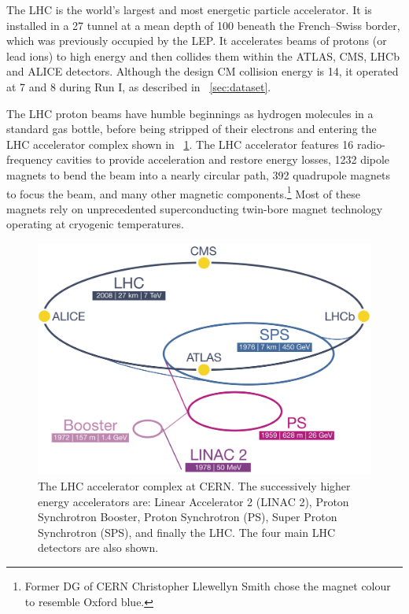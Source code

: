 
The \ac{LHC} is the world's largest and most energetic particle accelerator. It is 
installed in a \unit{27}{\kilo\metre} tunnel at a mean depth of \unit{100}{\metre} beneath 
the French--Swiss border, which was previously occupied by the \ac{LEP}. It accelerates 
beams of protons (or lead ions) to high energy and then collides them within the
ATLAS, CMS, LHCb and ALICE detectors. Although the design \ac{CM} collision energy is 
\unit{14}{\TeV}, it operated at \unit{7}{\TeV} and \unit{8}{\TeV} during Run I, as 
described in \Section~\ref{sec:dataset}.

The \ac{LHC} proton beams have humble beginnings as hydrogen molecules in a standard gas 
bottle, before being stripped of their electrons and entering the \ac{LHC} accelerator 
complex shown in \Figure~\ref{fig:lhc}. The \ac{LHC} accelerator features 16 
radio-frequency cavities to provide acceleration and restore energy losses, 1232 
dipole magnets to bend the beam into a nearly circular path, 392 quadrupole magnets to 
focus the beam, and many other magnetic components.\footnote{
	Former DG of CERN Christopher Llewellyn Smith chose the magnet colour to resemble Oxford blue.
}
Most of these magnets rely on 
unprecedented superconducting twin-bore magnet technology operating at cryogenic 
temperatures.

\begin{figure}
	\includegraphics[width=\largefigwidth]{tex/experiment/lhc}
	\caption{The \ac{LHC} accelerator complex at CERN. The successively higher energy 
	accelerators are: Linear Accelerator 2 (LINAC 2), Proton Synchrotron Booster, Proton 
	Synchrotron (PS), Super Proton Synchrotron (SPS), and finally the \acf{LHC}. The four 
	main \ac{LHC} detectors are also shown.}
	\label{fig:lhc}
\end{figure}

